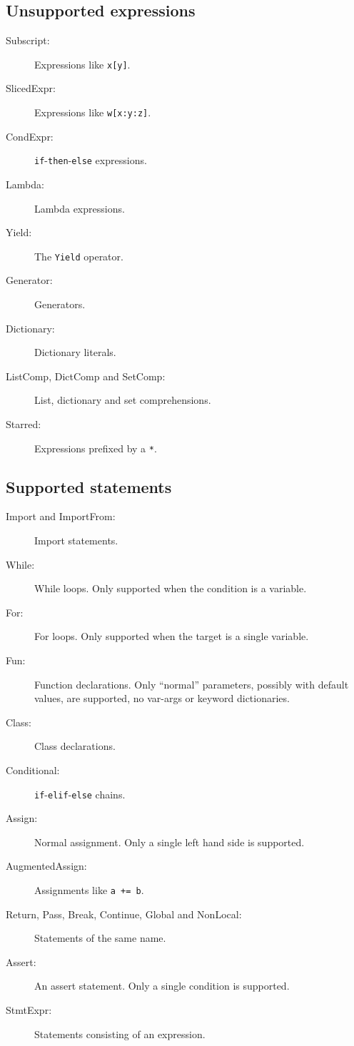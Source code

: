 \documentclass[11pt]{report}
\begin{document}
\subsection{Unsupported expressions}
\begin{description}
  \item[Subscript:] Expressions like \verb|x[y]|.
  \item[SlicedExpr:] Expressions like \verb|w[x:y:z]|.
  \item[CondExpr:] \verb|if|-\verb|then|-\verb|else| expressions.
  \item[Lambda:] Lambda expressions.
  \item[Yield:] The \verb|Yield| operator.
  \item[Generator:] Generators.
  \item[Dictionary:] Dictionary literals.
  \item[ListComp, DictComp and SetComp:] List, dictionary and set
    comprehensions.
  \item[Starred:] Expressions prefixed by a \verb|*|.
\end{description}

\subsection{Supported statements}
\begin{description}
  \item[Import and ImportFrom:] Import statements.
  \item[While:] While loops. Only supported when the condition is a
    variable.
  \item[For:] For loops. Only supported when the target is a single
    variable.
  \item[Fun:] Function declarations. Only ``normal'' parameters,
    possibly with default values, are supported, no var-args or
    keyword dictionaries.
  \item[Class:] Class declarations.
  \item[Conditional:] \verb|if|-\verb|elif|-\verb|else| chains.
  \item[Assign:] Normal assignment. Only a single left hand side is
    supported.
  \item[AugmentedAssign:] Assignments like \verb|a += b|.
  \item[Return, Pass, Break, Continue, Global and NonLocal:]
    Statements of the same name.
  \item[Assert:] An assert statement. Only a single condition is
    supported.
  \item[StmtExpr:] Statements consisting of an expression.
\end{description}
\end{document}
